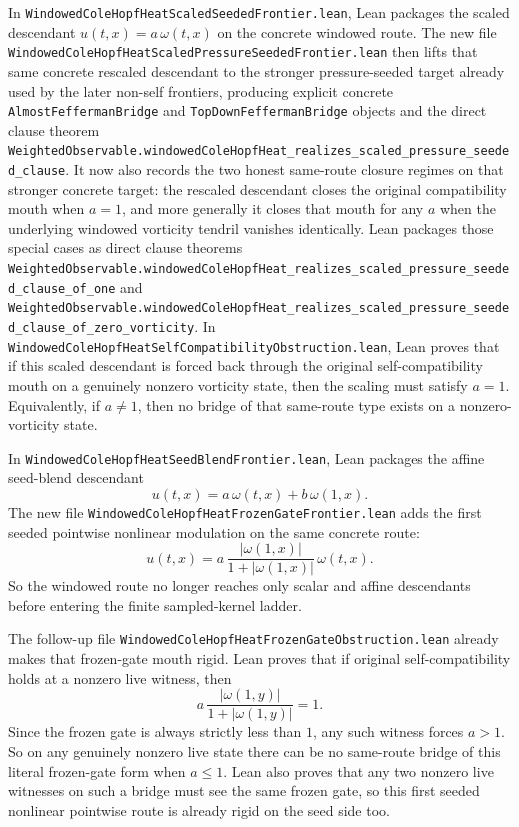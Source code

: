 \documentclass[11pt]{article}
\begin{document}
In \texttt{WindowedColeHopfHeatScaledSeededFrontier.lean}, Lean packages the
scaled descendant \(u(t,x)=a\,\omega(t,x)\) on the concrete windowed route.
The new file \texttt{WindowedColeHopfHeatScaledPressureSeededFrontier.lean}
then lifts that same concrete rescaled descendant to the stronger
pressure-seeded target already used by the later non-self frontiers, producing
explicit concrete \texttt{AlmostFeffermanBridge} and
\texttt{TopDownFeffermanBridge} objects and the direct clause theorem
\texttt{WeightedObservable.windowedColeHopfHeat\_realizes\_scaled\_pressure\_seeded\_clause}.
It now also records the two honest same-route closure regimes on that stronger
concrete target: the rescaled descendant closes the original compatibility
mouth when \(a=1\), and more generally it closes that mouth for any \(a\) when
the underlying windowed vorticity tendril vanishes identically.  Lean packages
those special cases as direct clause theorems
\texttt{WeightedObservable.windowedColeHopfHeat\_realizes\_scaled\_pressure\_seeded\_clause\_of\_one}
and
\texttt{WeightedObservable.windowedColeHopfHeat\_realizes\_scaled\_pressure\_seeded\_clause\_of\_zero\_vorticity}.
In \texttt{WindowedColeHopfHeatSelfCompatibilityObstruction.lean}, Lean proves
that if this scaled descendant is forced back through the original
self-compatibility mouth on a genuinely nonzero vorticity state, then the
scaling must satisfy \(a=1\).  Equivalently, if \(a\neq 1\), then no bridge of
that same-route type exists on a nonzero-vorticity state.

In \texttt{WindowedColeHopfHeatSeedBlendFrontier.lean}, Lean packages the
affine seed-blend descendant
\[
u(t,x)=a\,\omega(t,x)+b\,\omega(1,x).
\]
The new file \texttt{WindowedColeHopfHeatFrozenGateFrontier.lean} adds the
first seeded pointwise nonlinear modulation on the same concrete route:
\[
u(t,x)=a\,\frac{|\omega(1,x)|}{1+|\omega(1,x)|}\,\omega(t,x).
\]
So the windowed route no longer reaches only scalar and affine descendants
before entering the finite sampled-kernel ladder.

The follow-up file
\texttt{WindowedColeHopfHeatFrozenGateObstruction.lean} already makes that
frozen-gate mouth rigid.  Lean proves that if original self-compatibility
holds at a nonzero live witness, then
\[
  a\,\frac{|\omega(1,y)|}{1+|\omega(1,y)|}=1.
\]
Since the frozen gate is always strictly less than \(1\), any such witness
forces \(a>1\).  So on any genuinely nonzero live state there can be no
same-route bridge of this literal frozen-gate form when \(a \le 1\).  Lean
also proves that any two nonzero live witnesses on such a bridge must see the
same frozen gate, so this first seeded nonlinear pointwise route is already
rigid on the seed side too.
\end{document}
